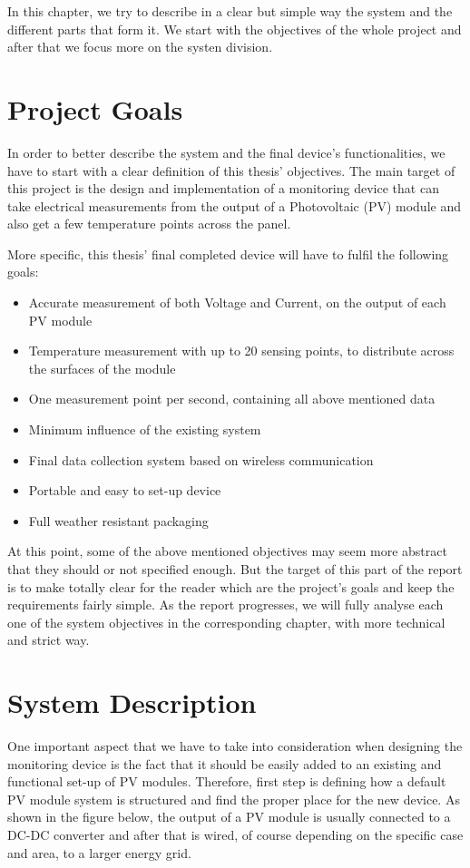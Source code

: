 In this chapter, we try to describe in a clear but simple way the system and the different parts that form it. We start with the objectives of the whole project and after that we focus more on the systen division.

\section{Project Goals}
In order to better describe the system and the final device's functionalities, we have to start with a clear definition of this thesis' objectives. The main target of this project is  the design and implementation of a monitoring device that can take electrical measurements from the output of a Photovoltaic (PV) module and also get a few temperature points across the panel.\par
More specific, this thesis' final completed device will have to fulfil the following goals:

\begin{itemize}
  \item Accurate measurement of both Voltage and Current, on the output of each PV module
  \item Temperature measurement with up to 20 sensing points, to distribute across the surfaces of the module
  \item One measurement point per second, containing all above mentioned data
  \item Minimum influence of the existing system
  \item Final data collection system based on wireless communication
  \item Portable and easy to set-up device
  \item Full weather resistant packaging
\end{itemize}

At this point, some of the above mentioned objectives may seem more abstract that they should or not specified enough. But the target of this part of the report is to make totally clear for the reader which are the project's goals and keep the requirements fairly simple. As the report progresses, we will fully analyse each one of the system objectives in the corresponding chapter, with more technical and strict way.

\section{System Description}
 One important aspect that we have to take into consideration when designing the monitoring device is the fact that it should be easily added to an existing and functional set-up of PV modules. Therefore, first step is defining how a default PV module system is structured and find the proper place for the new device. As shown in the figure below, the output of a PV module is usually connected to a DC-DC converter and after that is wired, of course depending on the specific case and area, to a larger energy grid.
 
